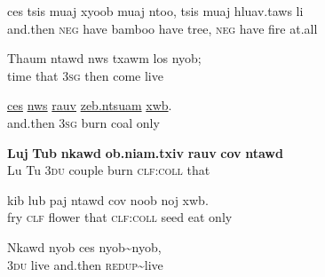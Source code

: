 \documentclass[output=paper]{LSP/langsci}
\begin{document}
\begin{exe}
 \label{JaexApp22}
\gll ces tsis muaj xyoob muaj ntoo, tsis muaj hluav.taws li\\
     and.then \textsc{neg} have bamboo have tree, \textsc{neg} have fire at.all\\
\glt  {}
\end{exe}

\begin{exe}
 \label{JaexApp23}
\gll Thaum ntawd nws txawm los nyob;\\
     time that \textsc{3sg} then come live\\
\glt  {}
\end{exe}

\begin{exe}
 \label{JaexApp24}
\gll \underline{ces} \underline{nws} \underline{rauv} \underline{zeb.ntsuam} \underline{xwb}.\\
     and.then \textsc{3sg} burn coal only\\
\glt  {}
\end{exe}

\begin{exe}
 \label{JaexApp25}
\gll \textbf{Luj} \textbf{Tub} \textbf{nkawd} \textbf{ob.niam.txiv} \textbf{rauv} \textbf{cov} \textbf{ntawd}\\
     Lu Tu \textsc{3du} couple burn \textsc{clf:coll} that\\
\glt  {}
\end{exe}

\begin{exe}
 \label{JaexApp26}
\gll kib lub paj ntawd cov noob noj xwb.\\
     fry \textsc{clf} flower that \textsc{clf:coll} seed eat only\\
\glt {}
\end{exe}

\begin{exe}
 \label{JaexApp27}
\gll Nkawd nyob ces nyob{\textasciitilde}nyob,\\
     \textsc{3du} live and.then \textsc{redup}{\textasciitilde}live\\
\glt {}
\end{exe}
\end{document}

